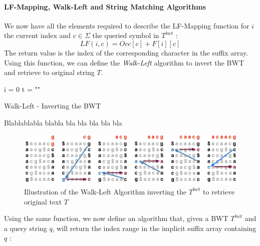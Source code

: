 \paragraph{LF-Mapping, Walk-Left and String Matching Algorithms}
We now have all the elements required to describe the LF-Mapping function for $i$ the current index and $c \in \Sigma$ the queried symbol in $T^{bwt}$  : 
\begin{equation*}
LF(i, c) = Occ[c] + F[i][c]
\end{equation*}
The return value is the index of the corresponding character in the suffix array. \\
Using this function, we can define the \textsl{Walk-Left} algorithm to invert the BWT and retrieve to original string $T$. \\

\begin{minipage}[t]{0.55\textwidth}
\begin{algorithm}[H]
	\SetAlgoLined
	i = 0\;
	t = ""\;
\caption{Walk-Left - Inverting the BWT}
\end{algorithm}
\end{minipage}
\hspace{3mm}
\begin{minipage}[t]{0.3\textwidth}
Blablablabla blabla bla bla bla bla bla
\end{minipage}
\vspace*{5mm}

\begin{figure}[H]
\centering
\includegraphics[scale = 0.4]{Figures/WL_algo.png}
\caption{Illustration of the Walk-Left Algorithm inverting the $T^{bwt}$ to retrieve original text $T$}
\end{figure}

Using the same function, we now define an algorithm that, given a BWT $T^{bwt}$ and a query string $q$, will return the index range in the implicit suffix array containing $q$ : \\

